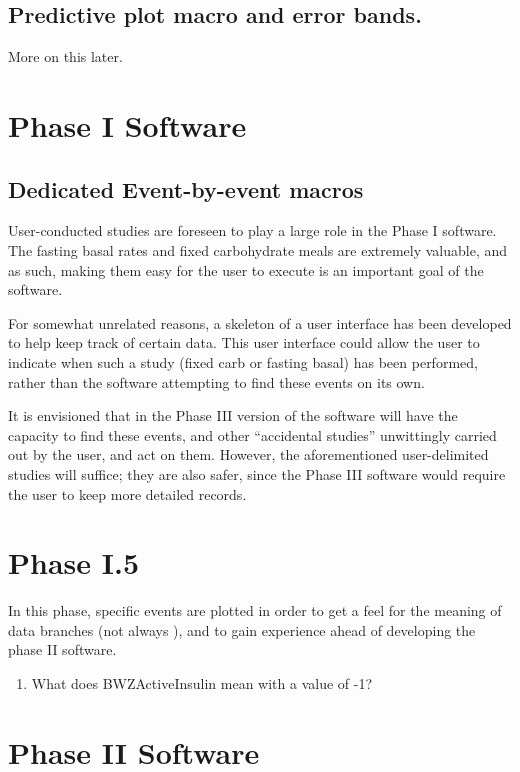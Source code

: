 \subsection{Predictive plot macro and error bands.} More on this later.


\section{Phase I Software}

\subsection{Dedicated Event-by-event macros}

User-conducted studies are foreseen to play a large role in the Phase I software. The fasting basal rates and fixed carbohydrate meals are extremely valuable, and as such, making them easy for the user to execute is an important goal of the software.

For somewhat unrelated reasons, a skeleton of a user interface has been developed to help keep track of certain data. This user interface could allow the user to indicate when such a study (fixed carb or fasting basal) has been performed, rather than the software attempting to find these events on its own.

It is envisioned that in the Phase III version of the software will have the capacity to find these events, and other ``accidental studies'' unwittingly carried out by the user, and act on them. However, the aforementioned user-delimited studies will suffice; they are also safer, since the Phase III software would require the user to keep more detailed records.

\section{Phase I.5}

In this phase, specific events are plotted in order to get a feel for the meaning of data branches (not always ), and to gain experience ahead of developing the phase II software.

\begin{enumerate}
\item What does BWZActiveInsulin mean with a value of -1?
\end{enumerate}

\section{Phase II Software}

